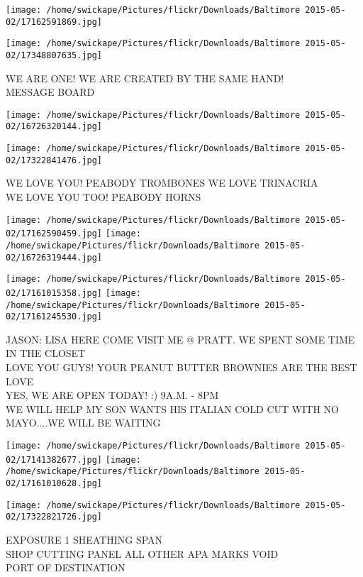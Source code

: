 \documentclass[10pt,letterpaper]{article}
\begin{document}
\texttt{[image: /home/swickape/Pictures/flickr/Downloads/Baltimore 2015-05-02/17162591869.jpg]}

\vspace{0.25in}
\texttt{[image: /home/swickape/Pictures/flickr/Downloads/Baltimore 2015-05-02/17348807635.jpg]}

WE ARE ONE!  WE ARE CREATED BY THE SAME HAND!\\
MESSAGE BOARD\\
\pagebreak

\texttt{[image: /home/swickape/Pictures/flickr/Downloads/Baltimore 2015-05-02/16726320144.jpg]}

\vspace{0.25in}
\texttt{[image: /home/swickape/Pictures/flickr/Downloads/Baltimore 2015-05-02/17322841476.jpg]}

WE LOVE YOU!  PEABODY TROMBONES WE LOVE TRINACRIA\\
WE LOVE YOU TOO!  PEABODY HORNS\\
\pagebreak

\texttt{[image: /home/swickape/Pictures/flickr/Downloads/Baltimore 2015-05-02/17162590459.jpg]}
\texttt{[image: /home/swickape/Pictures/flickr/Downloads/Baltimore 2015-05-02/16726319444.jpg]}

\texttt{[image: /home/swickape/Pictures/flickr/Downloads/Baltimore 2015-05-02/17161015358.jpg]}
\texttt{[image: /home/swickape/Pictures/flickr/Downloads/Baltimore 2015-05-02/17161245530.jpg]}

JASON: LISA HERE COME VISIT ME @ PRATT.  WE SPENT SOME TIME IN THE CLOSET\\
LOVE YOU GUYS!  YOUR PEANUT BUTTER BROWNIES ARE THE BEST LOVE\\
YES, WE ARE OPEN TODAY! :)  9A.M. {-} 8PM\\
WE WILL HELP MY SON WANTS HIS ITALIAN COLD CUT WITH NO MAYO....WE WILL BE WAITING\\
\pagebreak

\texttt{[image: /home/swickape/Pictures/flickr/Downloads/Baltimore 2015-05-02/17141382677.jpg]}
\texttt{[image: /home/swickape/Pictures/flickr/Downloads/Baltimore 2015-05-02/17161010628.jpg]}

\texttt{[image: /home/swickape/Pictures/flickr/Downloads/Baltimore 2015-05-02/17322821726.jpg]}

EXPOSURE 1 SHEATHING SPAN\\
SHOP CUTTING PANEL ALL OTHER APA MARKS VOID\\
PORT OF DESTINATION\\
\pagebreak
\end{document}
